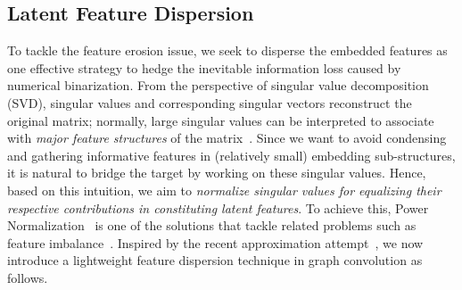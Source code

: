 \subsection{Latent Feature Dispersion}
\label{sec:fd}

To tackle the feature erosion issue, we seek to disperse the embedded features as one effective strategy to hedge the inevitable information loss caused by numerical binarization.
From the perspective of singular value decomposition (SVD), singular values and corresponding singular vectors reconstruct the original matrix;
normally, large singular values can be interpreted to associate with \textit{major feature structures} of the matrix~\cite{wei2018grassmann}. 
Since we want to avoid condensing and gathering informative features in (relatively small) embedding sub-structures, it is natural to bridge the target by working on these singular values.
Hence, based on this intuition, we aim to \textit{normalize singular values for equalizing their respective contributions in constituting latent features}.
To achieve this, Power Normalization~\cite{koniusz2016higher,zhang2022spectral} is one of the solutions that tackle related problems such as feature imbalance~\cite{koniusz2018deeper}.
Inspired by the recent approximation attempt~\cite{yu2020toward}, we now introduce a lightweight feature dispersion technique in graph convolution as follows.


